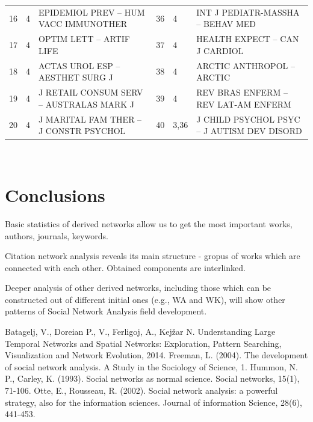 \documentclass[11pt]{article} %
\begin{document}
\begin{table}
\begin{tabular}{c|l|p{6cm}||c|l|p{6cm}|}
16&	4&	EPIDEMIOL PREV --  HUM VACC IMMUNOTHER      &	36&	4&	INT J PEDIATR-MASSHA --  BEHAV MED      \\
17&	4&	OPTIM LETT --  ARTIF LIFE       &	37&	4&	HEALTH EXPECT --  CAN J CARDIOL      \\
18&	4&	ACTAS UROL ESP --  AESTHET SURG J     &	38&	4&	ARCTIC ANTHROPOL --  ARCTIC        \\
19&	4&	J RETAIL CONSUM SERV --  AUSTRALAS MARK J    &	39&	4&	REV BRAS ENFERM --  REV LAT-AM ENFERM     \\
20&	4&	J MARITAL FAM THER --  J CONSTR PSYCHOL    &	40&	3,36&	J CHILD PSYCHOL PSYC --  J AUTISM DEV DISORD   \\ \hline 
\end{tabular}\\
\end{table}  





\section{Conclusions}


Basic statistics of derived networks allow us to get the most important works, authors, journals, keywords. \medskip

Citation network analysis reveals its main structure - gropus of works which are connected with each other. Obtained components are interlinked. \medskip

Deeper analysis of other derived networks, including those which can be constructed out of different initial ones (e.g., WA and WK), will show other patterns of Social Network Analysis field development. 





\begin{thebibliography}{99}
Batagelj, V., Doreian P., V., Ferligoj, A., Kejžar N. Understanding Large Temporal Networks and Spatial Networks: Exploration, Pattern Searching, Visualization and Network Evolution, 2014.
   Freeman, L. (2004). The development of social network analysis. A Study in the Sociology of Science, 1.
   Hummon, N. P., Carley, K. (1993). Social networks as normal science. Social networks, 15(1), 71-106.
   Otte, E., Rousseau, R. (2002). Social network analysis: a powerful strategy, also for the information sciences. Journal of information Science, 28(6), 441-453. 
\end{thebibliography}
\end{document}
